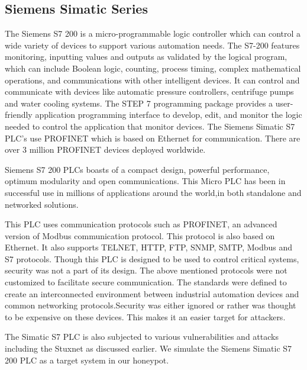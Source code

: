 \documentclass[article,msc=informatik,type=msc,colorback,accentcolor=tud9c]{tudthesis}
\begin{document}
   
   
   \subsection{Siemens Simatic Series}\label{Siemens Simatic Series}
   
   	The Siemens S7 200 is a micro-programmable logic controller which can control a wide variety of devices to support various automation needs. The S7-200 features monitoring, inputting values and outputs as validated by the logical program, which can include Boolean logic, counting, process timing, complex mathematical operations, and communications with other intelligent devices. It can control and communicate with devices like automatic pressure controllers, centrifuge pumps and water cooling systems. The STEP 7 programming package provides a user-friendly application programming interface to develop, edit, and monitor the logic needed to control the application that monitor devices. The Siemens Simatic S7 \ac{PLC}'s use PROFINET which is based on Ethernet for communication. There are over 3 million PROFINET devices deployed worldwide. 
   	
   	
   	\vspace{3mm}
   	Siemens S7 200 \ac{PLC}s boasts of a compact design, powerful performance, optimum modularity and open communications. This Micro \ac{PLC} has been in successful use in millions of applications around the world,in both standalone and networked solutions. 
   	
   	
   	\vspace{3mm}
   	This \ac{PLC} uses communication protocols such as PROFINET, an advanced version of Modbus communication protocol. This protocol is also based on Ethernet. It also supports TELNET, \ac{HTTP}, \ac{FTP}, \ac{SNMP}, \ac{SMTP}, Modbus and \ac{S7} protocols. Though this \ac{PLC} is designed to be used to control critical systems, security was not a part of its design. The above mentioned protocols were not customized to facilitate secure communication. The standards were defined to create an interconnected environment between industrial automation devices and common networking protocols.Security was either ignored or rather was thought to be expensive on these devices. This makes it an easier target for attackers. 
   
   
   	\vspace{3mm}
   	The Simatic S7 \ac{PLC} is also subjected to various vulnerabilities and attacks including the Stuxnet as discussed earlier. We simulate the Siemens Simatic S7 200 \ac{PLC} as a target system in our honeypot.  
   
\end{document}

